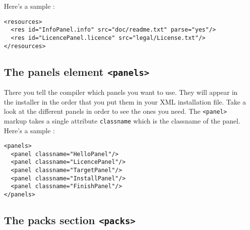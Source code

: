 Here's a sample :
\footnotesize
\begin{verbatim}
<resources>
  <res id="InfoPanel.info" src="doc/readme.txt" parse="yes"/>
  <res id="LicencePanel.licence" src="legal/License.txt"/>
</resources>
\end{verbatim}
\normalsize

\subsection{The panels element \texttt{<panels>}}

There you tell the compiler which panels you want to use. They will appear in
the installer in the order that you put them in your XML installation file. Take
a look at the different panels in order to see the ones you need. The
\texttt{<panel>} markup takes a single attribute \texttt{classname} which is the
classname of the panel.\\

Here's a sample :
\footnotesize
\begin{verbatim}
<panels>
  <panel classname="HelloPanel"/>
  <panel classname="LicencePanel"/>
  <panel classname="TargetPanel"/>
  <panel classname="InstallPanel"/>
  <panel classname="FinishPanel"/>
</panels>
\end{verbatim}
\normalsize

\subsection{The packs section \texttt{<packs>}}

